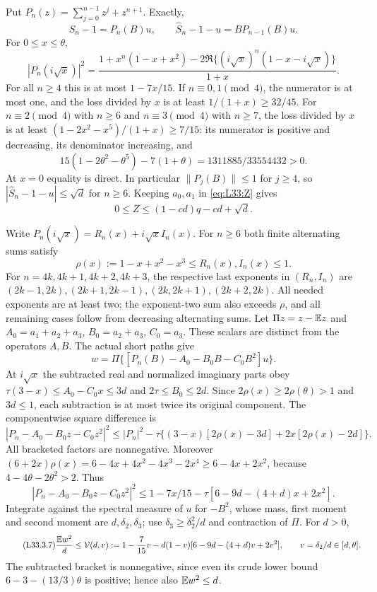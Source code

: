 Put $P_n(z)=\sum_{j=0}^{n-1}z^j+z^{n+1}$. Exactly,
\[
\widehat S_n-1=P_n(B)u,\qquad
\widehat S_n-1-u=BP_{n-1}(B)u.
\]
For $0\le x\le\theta$,
\begin{equation}\tag{L33.3.1}\label{eq:L33:finiteP}
|P_n(i\sqrt x)|^2=
\frac{1+x^n(1-x+x^2)-2\Re\{(i\sqrt x)^n(1-x-i\sqrt x)\}}{1+x}.
\end{equation}
For all $n\ge4$ this is at most $1-7x/15$. If $n\equiv0,1\pmod4$,
the numerator is at most one, and the loss divided by $x$ is at least
$1/(1+x)\ge32/45$. For $n\equiv2\pmod4$ with $n\ge6$ and
$n\equiv3\pmod4$ with $n\ge7$, the loss divided by $x$ is at least
$(1-2x^2-x^5)/(1+x)\ge7/15$: its numerator is positive and decreasing,
its denominator increasing, and
\[
15(1-2\theta^2-\theta^5)-7(1+\theta)=1311885/33554432>0.
\]
At $x=0$ equality is direct. In particular $\|P_j(B)\|\le1$ for
$j\ge4$, so $|\widehat S_n-1-u|\le\sqrt d$ for $n\ge6$.
Keeping $a_0,a_1$ in \eqref{eq:L33:Z} gives
\begin{equation}\tag{L33.3.3}\label{eq:L33:row}
0\le Z\le(1-cd)q-cd+\sqrt d.
\end{equation}

Write $P_n(i\sqrt x)=R_n(x)+i\sqrt x I_n(x)$. For $n\ge6$ both
finite alternating sums satisfy
\begin{equation}\tag{L33.3.4}\label{eq:L33:RI}
\rho(x):=1-x+x^2-x^3\le R_n(x),I_n(x)\le1.
\end{equation}
For $n=4k,4k+1,4k+2,4k+3$, the respective last exponents in
$(R_n,I_n)$ are $(2k-1,\allowbreak 2k),\allowbreak (2k+1,\allowbreak 2k-1),\allowbreak (2k,\allowbreak 2k+1),\allowbreak (2k+2,\allowbreak 2k)$.
All needed exponents are at least two; the exponent-two sum also exceeds
$\rho$, and all remaining cases follow from decreasing alternating sums.
Let $\Pi z=z-\mathbb E z$ and
$A_0=a_1+a_2+a_3$, $B_0=a_2+a_3$, $C_0=a_3$. These scalars are
distinct from the operators $A,B$. The actual short paths give
\[
w=\Pi\{[P_n(B)-A_0-B_0B-C_0B^2]u\}.
\]
At $i\sqrt x$ the subtracted real and normalized imaginary parts obey
$\tau(3-x)\le A_0-C_0x\le3d$ and $2\tau\le B_0\le2d$.
Since $2\rho(x)\ge2\rho(\theta)>1$ and $3d\le1$, each subtraction is
at most twice its original component. The componentwise square difference is
\[
|P_n-A_0-B_0z-C_0z^2|^2\le|P_n|^2
-\tau\{(3-x)[2\rho(x)-3d]+2x[2\rho(x)-2d]\}.
\]
All bracketed factors are nonnegative. Moreover
$(6+2x)\rho(x)=6-4x+4x^2-4x^3-2x^4\ge6-4x+2x^2$,
because $4-4\theta-2\theta^2>2$. Thus
\[
|P_n-A_0-B_0z-C_0z^2|^2\le
1-7x/15-\tau[6-9d-(4+d)x+2x^2].
\]
Integrate against the spectral measure of $u$ for $-B^2$, whose mass,
first moment and second moment are $d,\delta_2,\delta_3$; use
$\delta_3\ge\delta_2^2/d$ and contraction of $\Pi$. For $d>0$,
\begin{equation}\tag{L33.3.7}\label{eq:L33:variance}
\frac{\mathbb E w^2}{d}\le\mathcal V(d,v):=
1-\frac7{15}v-d(1-v)[6-9d-(4+d)v+2v^2],\qquad
v=\delta_2/d\in[d,\theta].
\end{equation}
The subtracted bracket is nonnegative, since even its crude lower bound
$6-3-(13/3)\theta$ is positive; hence also $\mathbb E w^2\le d$.

